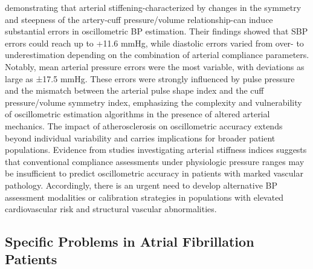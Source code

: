 \documentclass[
  12pt,
  letterpaper,
  openany,
  oneside]{book}
\begin{document}
demonstrating that arterial stiffening-characterized by changes in the
symmetry and steepness of the artery-cuff pressure/volume
relationship-can induce substantial errors in oscillometric BP
estimation. Their findings showed that SBP errors could reach up to
+11.6 mmHg, while diastolic errors varied from over- to underestimation
depending on the combination of arterial compliance parameters. Notably,
mean arterial pressure errors were the most variable, with deviations as
large as ±17.5 mmHg. These errors were strongly influenced by pulse
pressure and the mismatch between the arterial pulse shape index and the
cuff pressure/volume symmetry index, emphasizing the complexity and
vulnerability of oscillometric estimation algorithms in the presence of
altered arterial mechanics. The impact of atherosclerosis on
oscillometric accuracy extends beyond individual variability and carries
implications for broader patient populations. Evidence from studies
investigating arterial stiffness indices suggests that conventional
compliance assessments under physiologic pressure ranges may be
insufficient to predict oscillometric accuracy in patients with marked
vascular pathology. Accordingly, there is an urgent need to develop
alternative BP assessment modalities or calibration strategies in
populations with elevated cardiovascular risk and structural vascular
abnormalities.

\subsection{Specific Problems in Atrial Fibrillation
Patients}\label{specific-problems-in-atrial-fibrillation-patients}
\end{document}
